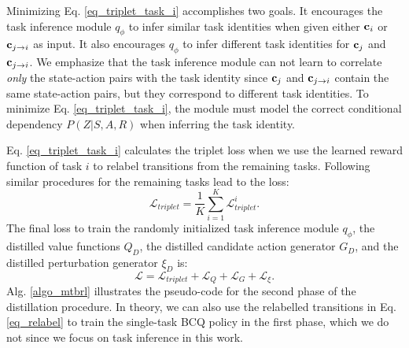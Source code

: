 Minimizing Eq. \ref{eq_triplet_task_i} accomplishes two goals. It encourages the task inference module $q_\phi$ to infer similar task identities when given either ${\bf c}_i$ or ${\bf c}_{j\rightarrow{i}}$ as input. It also encourages $q_\phi$ to infer different task identities for ${\bf c}_j$ and ${\bf c}_{j\rightarrow{i}}$. We emphasize that the task inference module can not learn to correlate \textit{only} the state-action pairs with the task identity since ${\bf c}_j$ and ${\bf c}_{j\rightarrow{i}}$ contain the same state-action pairs, but they correspond to different task identities. To minimize Eq. \ref{eq_triplet_task_i}, the module must model the correct conditional dependency $P(Z|S, A, R)$ when inferring the task identity.

Eq. \ref{eq_triplet_task_i} calculates the triplet loss when we use the learned reward function of task $i$ to relabel transitions from the remaining tasks. Following similar procedures for the remaining tasks lead to the loss:
\begin{equation}\label{eq_triplet_all_task}
    \mathcal{L}_{triplet} =  \frac{1}{K} \sum_{i=1}^{K} \mathcal{L}^i_{triplet}.
\end{equation}
The final loss to train the randomly initialized task inference module $q_\phi$, the distilled value functions $Q_D$, the distilled candidate action generator $G_D$, and the distilled perturbation generator $\xi_D$ is:
\begin{equation}\label{eq_loss_final}
    \mathcal{L} = \mathcal{L}_{triplet} + \mathcal{L}_Q + \mathcal{L}_G + \mathcal{L}_\xi.
\end{equation}
Alg. \ref{algo_mtbrl} illustrates the pseudo-code for the second phase of the distillation procedure. In theory, we can also use the relabelled transitions in Eq. \ref{eq_relabel} to train the single-task BCQ policy in the first phase, which we do not since we focus on task inference in this work.
